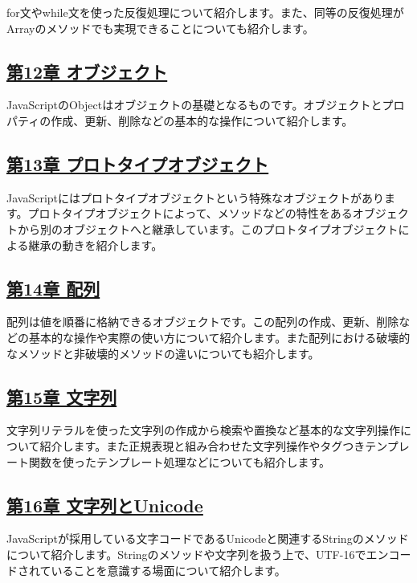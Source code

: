 for文やwhile文を使った反復処理について紹介します。また、同等の反復処理がArrayのメソッドでも実現できることについても紹介します。

\subsection*{\hyperlink{object}{第12章 オブジェクト}}

JavaScriptのObjectはオブジェクトの基礎となるものです。オブジェクトとプロパティの作成、更新、削除などの基本的な操作について紹介します。

\subsection*{\hyperlink{prototype-object}{第13章 プロトタイプオブジェクト}}

JavaScriptにはプロトタイプオブジェクトという特殊なオブジェクトがあります。プロトタイプオブジェクトによって、メソッドなどの特性をあるオブジェクトから別のオブジェクトへと継承しています。このプロトタイプオブジェクトによる継承の動きを紹介します。

\subsection*{\hyperlink{array}{第14章 配列}}

配列は値を順番に格納できるオブジェクトです。この配列の作成、更新、削除などの基本的な操作や実際の使い方について紹介します。また配列における破壊的なメソッドと非破壊的メソッドの違いについても紹介します。

\subsection*{\hyperlink{string}{第15章 文字列}}

文字列リテラルを使った文字列の作成から検索や置換など基本的な文字列操作について紹介します。また正規表現と組み合わせた文字列操作やタグつきテンプレート関数を使ったテンプレート処理などについても紹介します。

\subsection*{\hyperlink{string-unicode}{第16章 文字列とUnicode}}

JavaScriptが採用している文字コードであるUnicodeと関連するStringのメソッドについて紹介します。Stringのメソッドや文字列を扱う上で、UTF-16でエンコードされていることを意識する場面について紹介します。

